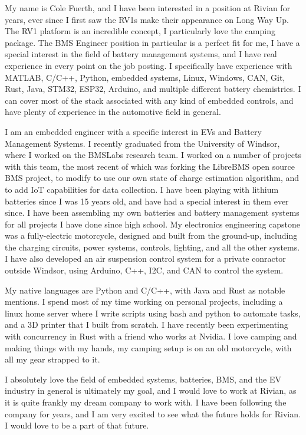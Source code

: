 My name is Cole Fuerth, and I have been interested in a position at Rivian for years, ever since I first saw the RV1s make their appearance on Long Way Up. The RV1 platform is an incredible concept, I particularly love the camping package. The BMS Engineer position in particular is a perfect fit for me, I have a special interest in the field of battery management systems, and I have real experience in every point on the job posting. I specifically have experience with MATLAB, C/C++, Python, embedded systems, Linux, Windows, CAN, Git, Rust, Java, STM32, ESP32, Arduino, and multiple different battery chemistries. I can cover most of the stack associated with any kind of embedded controls, and have plenty of experience in the automotive field in general.

I am an embedded engineer with a specific interest in EVs and Battery Management Systems. I recently graduated from the University of Windsor, where I worked on the BMSLabs research team. I worked on a number of projects with this team, the most recent of which was forking the LibreBMS open source BMS project, to modify to use our own state of charge estimation algorithm, and to add IoT capabilities for data collection. I have been playing with lithium batteries since I was 15 years old, and have had a special interest in them ever since. I have been assembling my own batteries and battery management systems for all projects I have done since high school. My electronics engineering capstone was a fully-electric motorcycle, designed and built from the ground-up, including the charging circuits, power systems, controls, lighting, and all the other systems. I have also developed an air suspension control system for a private conractor outside Windsor, using Arduino, C++, I2C, and CAN to control the system.

My native languages are Python and C/C++, with Java and Rust as notable mentions. I spend most of my time working on personal projects, including a linux home server where I write scripts using bash and python to automate tasks, and a 3D printer that I built from scratch. I have recently been experimenting with concurrency in Rust with a friend who works at Nvidia. I love camping and making things with my hands, my camping setup is on an old motorcycle, with all my gear strapped to it.

I absolutely love the field of embedded systems, batteries, BMS, and the EV industry in general is ultimately my goal, and I would love to work at Rivian, as it is quite frankly my dream company to work with. I have been following the company for years, and I am very excited to see what the future holds for Rivian. I would love to be a part of that future.